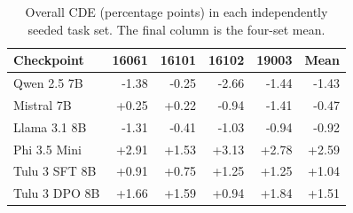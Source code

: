 \begin{table}[t]
\centering\scriptsize
\caption{Overall CDE (percentage points) in each independently seeded task set. The final column is the four-set mean.}
\label{tab:seed-cde}
\begin{tabular}{@{}lrrrrr@{}}
\toprule
Checkpoint & 16061 & 16101 & 16102 & 19003 & Mean \\
\midrule
Qwen 2.5 7B & -1.38 & -0.25 & -2.66 & -1.44 & -1.43 \\
Mistral 7B & +0.25 & +0.22 & -0.94 & -1.41 & -0.47 \\
Llama 3.1 8B & -1.31 & -0.41 & -1.03 & -0.94 & -0.92 \\
Phi 3.5 Mini & +2.91 & +1.53 & +3.13 & +2.78 & +2.59 \\
Tulu 3 SFT 8B & +0.91 & +0.75 & +1.25 & +1.25 & +1.04 \\
Tulu 3 DPO 8B & +1.66 & +1.59 & +0.94 & +1.84 & +1.51 \\
\bottomrule
\end{tabular}
\end{table}
